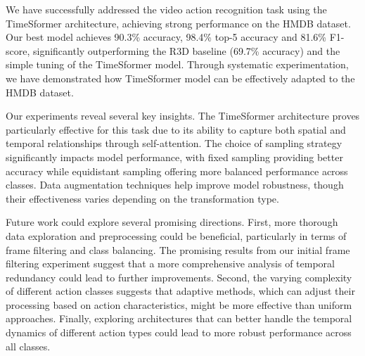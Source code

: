 We have successfully addressed the video action recognition task using the TimeSformer architecture, achieving strong performance on the HMDB dataset. 
Our best model achieves 90.3\% accuracy, 98.4\% top-5 accuracy and 81.6\% F1-score, significantly outperforming the R3D baseline (69.7\% accuracy) and the simple tuning of the TimeSformer model. 
Through systematic experimentation, we have demonstrated how TimeSformer model can be effectively adapted to the HMDB dataset.

Our experiments reveal several key insights.
The TimeSformer architecture proves particularly effective for this task due to its ability to capture both spatial and temporal relationships through self-attention.
The choice of sampling strategy significantly impacts model performance, with fixed sampling providing better accuracy while equidistant sampling offering more balanced performance across classes.
Data augmentation techniques help improve model robustness, though their effectiveness varies depending on the transformation type.

Future work could explore several promising directions. 
First, more thorough data exploration and preprocessing could be beneficial, particularly in terms of frame filtering and class balancing. 
The promising results from our initial frame filtering experiment suggest that a more comprehensive analysis of temporal redundancy could lead to further improvements. 
Second, the varying complexity of different action classes suggests that adaptive methods, which can adjust their processing based on action characteristics, might be more effective than uniform approaches. 
Finally, exploring architectures that can better handle the temporal dynamics of different action types could lead to more robust performance across all classes.
